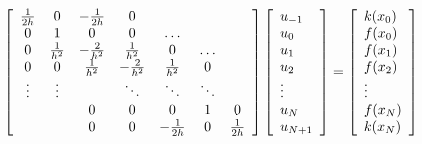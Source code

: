 \begin{equation*}
   \left[\begin{array}{ccccccc}
         {1\over 2h} &  0   & -{1\over 2h}&  0   &      &      &    \\
           0  &  1   &  0   & 0    &\ldots&      &   \\
         0    & {1\over h^2} & -{2\over h^2} & {1\over h^2} &  0   &\ldots&   \\
         0    &  0   & {1\over h^2} & -{2\over h^2} & {1\over h^2} &  0   &   \\
        \vdots&\vdots&      &\ddots&\ddots&\ddots&    \\
              &      &  0   &  0   &  0   &  1   &  0   \\
              &      &  0   &  0   & -{1\over 2h}&  0   & {1\over 2h}   
    \end{array} \right]
   \left[\begin{array}{l}
    u_{-1} \\ u_0 \\ u_1 \\ u_2 \\ \vdots \\ u_N \\ u_{N+1}
   \end{array}\right]
   = 
   \left[\begin{array}{l}
    k(x_0) \\ f(x_0) \\ f(x_1) \\ f(x_2) \\ \vdots \\ f(x_N) \\ k(x_N)
   \end{array} \right]
\end{equation*}




